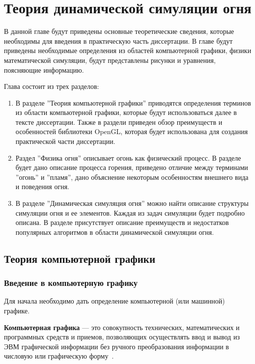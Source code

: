 \chapter{Теория динамической симуляции огня}

В данной главе будут приведены основные теоретические сведения, которые
необходимы для введения в практическую часть диссертации. В главе будут
приведены необходимые определения из областей компьютерной графики, физики
математической симуляции, будут представлены рисунки и уравнения, поясняющие
информацию.

Глава состоит из трех разделов:
\begin{enumerate}
    \item В разделе ''Теория компьютерной графики'' приводятся определения
        терминов из области компьютерной графики, которые будут использоваться
        далее в тексте диссертации. Также в раздели приведен обзор преимуществ и
        особенностей библиотеки OpenGL, которая будет использована для создания
        практической части диссертации.
    \item Раздел ''Физика огня'' описывает огонь как физический процесс. В
        разделе будет дано описание процесса горения, приведено отличие между
        терминами ''огонь'' и ''пламя'', дано объяснение некоторым особенностям
        внешнего вида и поведения огня.
    \item В разделе ''Динамическая симуляция огня'' можно найти описание\break{}
        структуры симуляции огня и ее элементов. Каждая из задач симуляции будет
        подробно описана. В разделе присутствует описание преимуществ и
        недостатков популярных алгоритмов в области динамической симуляции огня.
\end{enumerate}

\section{Теория компьютерной графики}

\subsection{Введение в компьютерную графику}

Для начала необходимо дать определение компьютерной (или машинной) графике.

\textbf{Компьютерная графика} --- это совокупность технических, математических и
программных средств и приемов, позволяющих осуществлять ввод и вывод из ЭВМ
графической информации без ручного преобразования информации в числовую или
графическую форму~\cite{SamalGraphics}.

